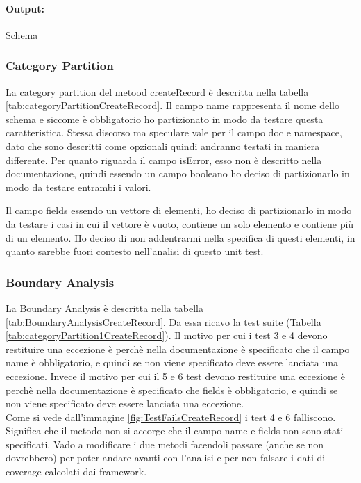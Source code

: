\documentclass[12pt, a4paper]{article}
\begin{document}
\paragraph{Output:} Schema

\subsubsection{Category Partition}



La category partition del metood createRecord è descritta nella tabella \ref{tab:categoryPartitionCreateRecord}.
Il campo name rappresenta il nome dello schema e siccome è obbligatorio ho partizionato in modo da testare questa caratteristica.
Stessa discorso ma speculare vale per il campo doc e namespace, dato che sono descritti come opzionali 
quindi andranno testati in maniera differente.
Per quanto riguarda il campo isError, esso non è descritto nella documentazione, quindi essendo un campo booleano
ho deciso di partizionarlo in modo da testare entrambi i valori.

Il campo fields essendo un vettore di elementi, ho deciso di partizionarlo in modo da testare i casi in cui il vettore
è vuoto, contiene un solo elemento e contiene più di un elemento. Ho deciso di non addentrarmi nella specifica di 
questi elementi, in quanto sarebbe fuori contesto nell'analisi di questo unit test.
\subsubsection{Boundary Analysis}

La Boundary Analysis è descritta nella tabella \ref{tab:BoundaryAnalysisCreateRecord}. 
Da essa ricavo la test suite (Tabella \ref{tab:categoryPartition1CreateRecord}).
Il motivo per cui i test 3 e 4 devono restituire una eccezione è perchè nella documentazione è specificato che
il campo name è obbligatorio, e quindi se non viene specificato deve essere lanciata una eccezione.
Invece il motivo per cui il 5 e 6 test devono restituire una eccezione è perchè nella documentazione è specificato che
fields è obbligatorio, e quindi se non viene specificato deve essere lanciata una eccezione. \\
Come si vede dall'immagine \ref{fig:TestFailsCreateRecord} i test 4 e 6 falliscono. Significa che il metodo non si accorge
che il campo name e fields non sono stati specificati. 
Vado a modificare i due metodi facendoli passare (anche se non dovrebbero) per poter andare avanti con l'analisi e 
per non falsare i dati di coverage calcolati dai framework.
\end{document}
